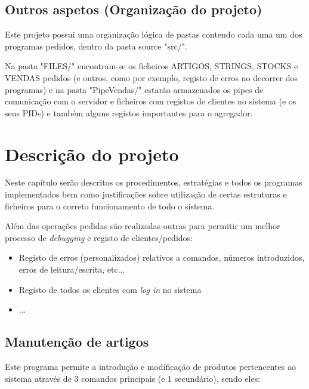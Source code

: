 \documentclass[a4paper,11pt]{report}
\begin{document}
\section{Outros aspetos (Organização do projeto)}

\hspace{0.50cm} Este projeto possui uma organização lógica de pastas contendo cada uma um dos programas pedidos, dentro da pasta source "src/". \par
Na pasta "FILES/" encontram-se os ficheiros ARTIGOS, STRINGS, STOCKS e VENDAS pedidos (e outros, como por exemplo, registo de erros no decorrer dos programas) e na pasta "PipeVendas/" estarão armazenados os pipes de comunicação com o servidor e ficheiros com registos de clientes no sistema (e os seus PIDs) e também alguns registos importantes para o agregador.



\chapter{Descrição do projeto}

\hspace{0.50cm} Neste capítulo serão descritos os procedimentos, estratégias e todos os programas implementados bem como justificações sobre utilização de certas estruturas e ficheiros para o correto funcionamento de todo o sistema. \par
Além das operações pedidas são realizadas outras para permitir um melhor processo de \textit{debugging} e registo de clientes/pedidos:
 
\begin{itemize}
  \item Registo de erros (personalizados) relativos a comandos, números introduzidos, erros de leitura/escrita, etc...
  \item Registo de todos os clientes com \textit{log in} no sistema
  \item ...
\end{itemize}

\section{Manutenção de artigos}

\hspace{0.50cm} Este programa permite a introdução e modificação de produtos pertencentes ao sistema através de 3 comandos principais (e 1 secundário), sendo eles:
\end{document}
